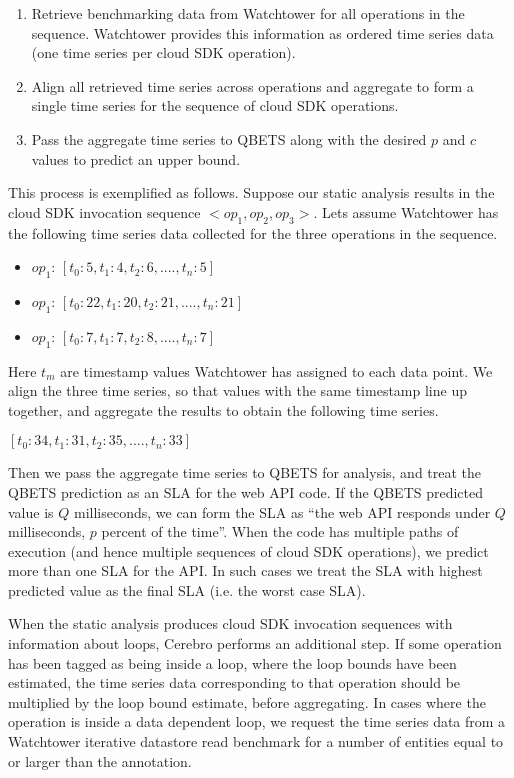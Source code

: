 \begin{enumerate}
\item Retrieve benchmarking data from Watchtower 
for all operations in the sequence. Watchtower provides
this information as ordered time series data (one time series per cloud SDK operation).
\item Align all retrieved time series across operations and aggregate
to form a single time series for the sequence of cloud SDK operations.
\item Pass the aggregate time series to QBETS along with the 
desired $p$ and $c$ values to predict an
upper bound. 
\end{enumerate}

This process is exemplified as follows.
Suppose our static analysis results in the
cloud SDK invocation sequence $<op_{1},op_{2},op_{3}>$. 
Lets assume Watchtower has the following
time series data collected for the three operations in the sequence.

\begin{itemize}
\item $op_{1}$: $[t_{0}: 5, t_{1}: 4, t_{2}: 6, ...., t_{n}: 5]$
\item $op_{1}$: $[t_{0}: 22, t_{1}: 20, t_{2}: 21, ...., t_{n}: 21]$
\item $op_{1}$: $[t_{0}: 7, t_{1}: 7, t_{2}: 8, ...., t_{n}: 7]$
\end{itemize}

Here $t_{m}$ are timestamp values Watchtower has assigned to 
each data point. We align the three
time series, so that values with the same timestamp line up 
together, and aggregate the results
to obtain the following time series.

$[t_{0}: 34, t_{1}: 31, t_{2}: 35, ...., t_{n}: 33]$

Then we pass the aggregate time series to QBETS for analysis, and
treat the QBETS prediction as an SLA for the web API code.
If the QBETS predicted value is $Q$ milliseconds, 
we can form the SLA as ``the web API responds 
under $Q$ milliseconds, $p$ percent of the time''. 
When the code has multiple paths of execution (and
hence multiple sequences of cloud SDK operations), 
we predict more than one SLA for the API. In
such cases we treat the SLA with highest predicted value 
as the final SLA (i.e. the worst case SLA).

When the static analysis produces cloud SDK invocation 
sequences with information about loops, Cerebro performs an additional step.
If some operation has been tagged as being inside a loop, where the loop
bounds have been estimated, the time series data corresponding to that 
operation should be multiplied 
by the loop bound estimate, before aggregating. In cases where the operation 
is inside a data dependent loop, we request the time series data from a 
Watchtower iterative datastore read benchmark for a number of entities 
equal to or larger than the annotation. 

